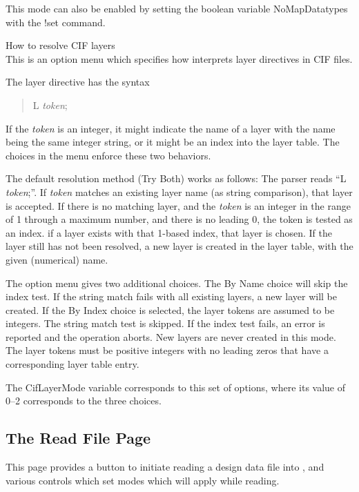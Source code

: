 \begin{description}
This mode can also be enabled by setting the boolean variable {\et
NoMapDatatypes} with the {\cb !set} command.

\item{\cb How to resolve CIF layers}\\
This is an option menu which specifies how {\Xic} interprets layer
directives in CIF files.

The layer directive has the syntax
\begin{quote}
{\vt L} {\it token}{\vt ;}
\end{quote}

If the {\it token} is an integer, it might indicate the name of a
layer with the name being the same integer string, or it might be an
index into the layer table.  The choices in the menu enforce these two
behaviors.

The default resolution method ({\cb Try Both}) works as follows:  The
parser reads ``{\vt L} {\it token}{\vt ;}''.  If {\it token} matches
an existing layer name (as string comparison), that layer is accepted. 
If there is no matching layer, and the {\it token} is an integer in
the range of 1 through a maximum number, and there is no leading 0,
the token is tested as an index.  if a layer exists with that 1-based
index, that layer is chosen.  If the layer still has not been
resolved, a new layer is created in the layer table, with the given
(numerical) name.

The option menu gives two additional choices.  The {\cb By Name}
choice will skip the index test.  If the string match fails with all
existing layers, a new layer will be created.  If the {\cb By Index}
choice is selected, the layer tokens are assumed to be integers.  The
string match test is skipped.  If the index test fails, an error is
reported and the operation aborts.  New layers are never created in
this mode.  The layer tokens must be positive integers with no leading
zeros that have a corresponding layer table entry.

The {\et CifLayerMode} variable corresponds to this set of options,
where its value of 0--2 corresponds to the three choices.
\end{description}

\subsection{The {\cb Read File} Page}

This page provides a button to initiate reading a design data file
into {\Xic}, and various controls which set modes which will apply
while reading.

